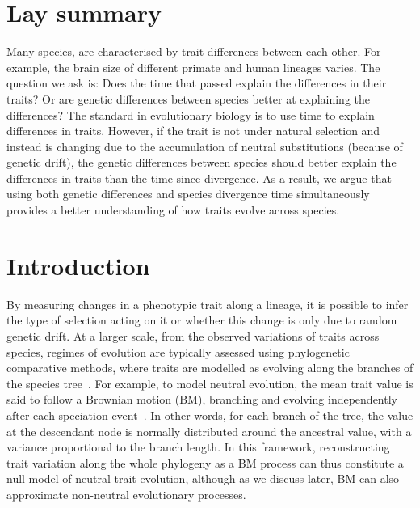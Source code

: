 \documentclass{article}
\begin{document}
\section*{Lay summary}\label{sec:summary}
Many species, are characterised by trait differences between each other.
For example, the brain size of different primate and human lineages varies.
The question we ask is: Does the time that passed explain the differences in their traits?
Or are genetic differences between species better at explaining the differences?
The standard in evolutionary biology is to use time to explain differences in traits.
However, if the trait is not under natural selection and instead is changing due to the accumulation of neutral substitutions (because of genetic drift), the genetic differences between species should better explain the differences in traits than the time since divergence.
As a result, we argue that using both genetic differences and species divergence time simultaneously provides a better understanding of how traits evolve across species.


\section*{Introduction}\label{sec:introduction}
By measuring changes in a phenotypic trait along a lineage, it is possible to infer the type of selection acting on it or whether this change is only due to random genetic drift.
At a larger scale, from the observed variations of traits across species, regimes of evolution are typically assessed using phylogenetic comparative methods, where traits are modelled as evolving along the branches of the species tree~\citep{felsenstein_phylogenies_1985, felsenstein_phylogenies_1988a, harmon_phylogenetic_2018}.
For example, to model neutral evolution, the mean trait value is said to follow a Brownian motion (BM), branching and evolving independently after each speciation event~\citep{felsenstein_phylogenies_1985, lynch_phenotypic_1986, hansen_translating_1996}.
In other words, for each branch of the tree, the value at the descendant node is normally distributed around the ancestral value, with a variance proportional to the branch length.
In this framework, reconstructing trait variation along the whole phylogeny as a BM process can thus constitute a null model of neutral trait evolution, although as we discuss later, BM can also approximate non-neutral evolutionary processes.
\end{document}
